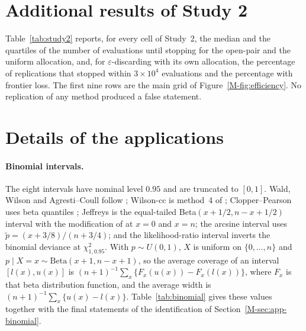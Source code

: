 \section{Additional results of Study 2}\label{sec:study2}

Table~\ref{tab:study2} reports, for every cell of Study~2, the median and the quartiles of the number of evaluations until stopping for the open-pair and the uniform allocation, and, for $\varepsilon$-discarding with its own allocation, the percentage of replications that stopped within $3\times10^4$ evaluations and the percentage with frontier loss. The first nine rows are the main grid of Figure~\ref{M-fig:efficiency}. No replication of any method produced a false statement.

\begin{table}[ht]
\centering
\caption{Study~2: median (quartiles) of the number of evaluations; 30 instances per cell, budget $3\times10^4$.}
\label{tab:study2}
\scriptsize

\end{table}

\section{Details of the applications}\label{sec:apps}

\paragraph{Binomial intervals.} The eight intervals have nominal level $0.95$ and are truncated to $[0,1]$. Wald, Wilson and Agresti--Coull follow \citet{agresti1998}; Wilson-cc is method~4 of \citet{newcombe1998}; Clopper--Pearson uses beta quantiles \citep{clopper1934}; Jeffreys is the equal-tailed Beta$(x+1/2,n-x+1/2)$ interval with the modification of \citet{brown2001} at $x=0$ and $x=n$; the arcsine interval uses $\tilde p=(x+3/8)/(n+3/4)$; and the likelihood-ratio interval inverts the binomial deviance at $\chi^2_{1,0.95}$. With $p\sim U(0,1)$, $X$ is uniform on $\{0,\dots,n\}$ and $p\mid X=x\sim\mathrm{Beta}(x+1,n-x+1)$, so the average coverage of an interval $[l(x),u(x)]$ is $(n+1)^{-1}\sum_x\{F_x(u(x))-F_x(l(x))\}$, where $F_x$ is that beta distribution function, and the average width is $(n+1)^{-1}\sum_x\{u(x)-l(x)\}$. Table~\ref{tab:binomial} gives these values together with the final statements of the identification of Section~\ref{M-sec:app-binomial}.

\begin{table}[ht]
\centering
\caption{Binomial intervals, $n=30$: exact average miscoverage and width over $p\sim U(0,1)$, membership of the Pareto set, number of evaluations (each the average of 100 simulated studies) and final statements after $10^5$ evaluations.}
\label{tab:binomial}
\footnotesize

\end{table}

